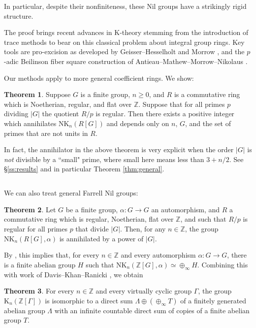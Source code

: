 \documentclass[reqno,11pt,letterpaper]{amsart}
\theoremstyle{plain}
\numberwithin{equation}{subsection}
\newtheorem{theorem}[equation]{Theorem}
\theoremstyle{remark}
\theoremstyle{plain}
\theoremstyle{definition}\newtheorem*{notation}{Notation}
\newtheorem{theorem}{Theorem}
\newcommand{\RK}{\mathrm{K}}
\newcommand{\RNK}{\mathrm{NK}}
\newcommand{\NK}{\mathrm{NK}}
\newcommand{\BZ}{\mathbb{Z}}
\begin{document}
In particular, despite their nonfiniteness, these Nil groups have a strikingly rigid structure.
 


The proof brings recent advances in $\RK$-theory stemming from the introduction of trace methods to bear on this classical problem about integral group rings. Key tools
  are  pro-excision as developed by Geisser--Hesselholt \cite{GHbi} and Morrow \cite{Morrowpro2}, and the $p$-adic Beilinson fiber square construction of Antieau--Mathew--Morrow--Nikolaus \cite{NikolausBFSq}. 

Our methods apply to more general coefficient rings. We show:

 
 
\begin{theorem}\label{thm:MainIntro}
Suppose $G$ is a finite group, $n\geq 0$, and $R$ is a commutative ring
which is Noetherian, regular, and flat over $\BZ$. Suppose that for all primes $p$
dividing $|G|$  the quotient $R/p$ is regular.   Then there exists a positive integer  which  annihilates $\RNK_n(R[G])$ and depends only on $n$, $G$, and the set of primes  that  are not units in $R$. 
\end{theorem}

 

In fact,   the annihilator in the above theorem  is very explicit when the order $|G|$ is \emph{not} divisible by a ``small" prime, where small here means less than $3+n/2$.
See \S \ref{ss:results} and in particular Theorem \ref{thm:general}. 

\subsection{}\label{ss:introtwisted}  We can also treat general Farrell Nil groups:
  \begin{theorem}\label{FarrellNilThm_Intro}
Let $G$ be a finite group,  $\alpha: G\to G$ an automorphism, and $R$ a commutative ring which  is regular, Noetherian, flat over $\BZ$, and such that $R/p$ is regular for all primes $p$ that divide $|G|$. Then, for any $n\in\BZ$, the group $\NK_n(R[G],\alpha)$ is annihilated by a power of $|G|$.
\end{theorem}

By \cite[Theorem C]{LPW}, this implies that, for every $n\in\BZ$ and every automorphism $\alpha:G\to G$, there is a finite abelian group $H$ such that  $\RNK_{n}(\BZ[G], \alpha)\simeq \oplus_\infty H$. Combining this with work of Davis--Khan--Ranicki \cite{DKR}, we obtain
\begin{theorem}\label{cor2_Intro}
For every $n\in \BZ$ and every virtually   cyclic group $\Gamma$, the group $\RK_n(\BZ[\Gamma])$ is isomorphic to a direct sum 
$
\Lambda\oplus (\oplus_\infty T)
$
of a finitely generated abelian group $\Lambda$
with an infinite countable direct sum  of copies of a finite abelian group $T$.
\end{theorem}
\end{document}
